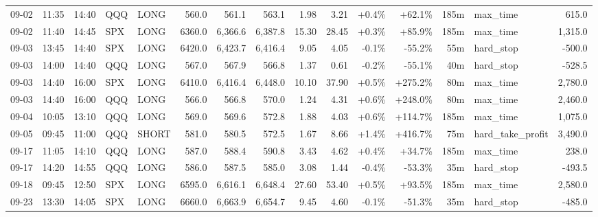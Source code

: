 \documentclass[11pt,a4paper,twoside]{article}
\begin{document}
\begin{landscape}
\begin{center}
\begin{longtable}{>{\color{txtmain}}l l l l l r r r r r r r r >{\color{txtmain}}l r}
09-02 & 11:35 & 14:40 & QQQ & LONG & 560.0 & 561.1 & 563.1 & 1.98 & 3.21 & \textcolor{wingreen}{+0.4\%} & \textcolor{wingreen}{+62.1\%} & 185m & max\_time & \textcolor{wingreen}{615.0} \\
09-02 & 11:40 & 14:45 & SPX & LONG & 6360.0 & 6,366.6 & 6,387.8 & 15.30 & 28.45 & \textcolor{wingreen}{+0.3\%} & \textcolor{wingreen}{+85.9\%} & 185m & max\_time & \textcolor{wingreen}{1,315.0} \\
09-03 & 13:45 & 14:40 & SPX & LONG & 6420.0 & 6,423.7 & 6,416.4 & 9.05 & 4.05 & \textcolor{lossred}{-0.1\%} & \textcolor{lossred}{-55.2\%} & 55m & hard\_stop & \textcolor{lossred}{-500.0} \\
09-03 & 14:00 & 14:40 & QQQ & LONG & 567.0 & 567.9 & 566.8 & 1.37 & 0.61 & \textcolor{lossred}{-0.2\%} & \textcolor{lossred}{-55.1\%} & 40m & hard\_stop & \textcolor{lossred}{-528.5} \\
09-03 & 14:40 & 16:00 & SPX & LONG & 6410.0 & 6,416.4 & 6,448.0 & 10.10 & 37.90 & \textcolor{wingreen}{+0.5\%} & \textcolor{wingreen}{+275.2\%} & 80m & max\_time & \textcolor{wingreen}{2,780.0} \\
09-03 & 14:40 & 16:00 & QQQ & LONG & 566.0 & 566.8 & 570.0 & 1.24 & 4.31 & \textcolor{wingreen}{+0.6\%} & \textcolor{wingreen}{+248.0\%} & 80m & max\_time & \textcolor{wingreen}{2,460.0} \\
09-04 & 10:05 & 13:10 & QQQ & LONG & 569.0 & 569.6 & 572.8 & 1.88 & 4.03 & \textcolor{wingreen}{+0.6\%} & \textcolor{wingreen}{+114.7\%} & 185m & max\_time & \textcolor{wingreen}{1,075.0} \\
09-05 & 09:45 & 11:00 & QQQ & SHORT & 581.0 & 580.5 & 572.5 & 1.67 & 8.66 & \textcolor{wingreen}{+1.4\%} & \textcolor{wingreen}{+416.7\%} & 75m & hard\_take\_profit & \textcolor{wingreen}{3,490.0} \\
09-17 & 11:05 & 14:10 & QQQ & LONG & 587.0 & 588.4 & 590.8 & 3.43 & 4.62 & \textcolor{wingreen}{+0.4\%} & \textcolor{wingreen}{+34.7\%} & 185m & max\_time & \textcolor{wingreen}{238.0} \\
09-17 & 14:20 & 14:55 & QQQ & LONG & 586.0 & 587.5 & 585.0 & 3.08 & 1.44 & \textcolor{lossred}{-0.4\%} & \textcolor{lossred}{-53.3\%} & 35m & hard\_stop & \textcolor{lossred}{-493.5} \\
09-18 & 09:45 & 12:50 & SPX & LONG & 6595.0 & 6,616.1 & 6,648.4 & 27.60 & 53.40 & \textcolor{wingreen}{+0.5\%} & \textcolor{wingreen}{+93.5\%} & 185m & max\_time & \textcolor{wingreen}{2,580.0} \\
09-23 & 13:30 & 14:05 & SPX & LONG & 6660.0 & 6,663.9 & 6,654.7 & 9.45 & 4.60 & \textcolor{lossred}{-0.1\%} & \textcolor{lossred}{-51.3\%} & 35m & hard\_stop & \textcolor{lossred}{-485.0} \\

\end{longtable}
\end{center}
\end{landscape}
\end{document}
